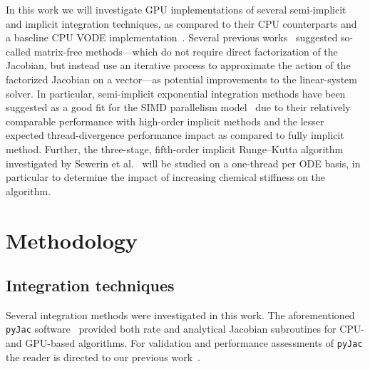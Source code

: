 \documentclass[preprint]{elsarticle}
\begin{document}
In this work we will investigate GPU implementations of several semi-implicit and implicit integration techniques, as compared to their CPU counterparts and a baseline CPU VODE implementation~\cite{Hindmarsh:2005hg}.
Several previous works~\cite{Stone:2013aa,Bisetti:2012jw,Niemeyer:2014aa,Perini20141180,McNenly2015581} suggested so-called matrix-free methods---which do not require direct factorization of the Jacobian, but instead use an iterative process to approximate the action of the factorized Jacobian on a vector---as potential improvements to the linear-system solver.
In particular, semi-implicit exponential integration methods have been suggested as a good fit for the SIMD parallelism model~\cite{Stone:2013aa,Bisetti:2012jw,Niemeyer:2014aa} due to their relatively comparable performance with high-order implicit methods and the lesser expected thread-divergence performance impact as compared to fully implicit method.
Further, the three-stage, fifth-order implicit Runge--Kutta algorithm~\cite{hairer1996solving} investigated by Sewerin et al.~\cite{Sewerin20151375} will be studied on a one-thread per ODE basis, in particular to determine the impact of increasing chemical stiffness on the algorithm.

\section{Methodology}
\label{sec:Method}


\subsection{Integration techniques}

Several integration methods were investigated in this work.
The aforementioned \texttt{pyJac} software~\cite{Niemeyer:2015im} provided both rate and analytical Jacobian subroutines for CPU- and GPU-based algorithms.
For validation and performance assessments of \texttt{pyJac} the reader is directed to our previous work~\cite{Niemeyer:2015ws}.
\end{document}
